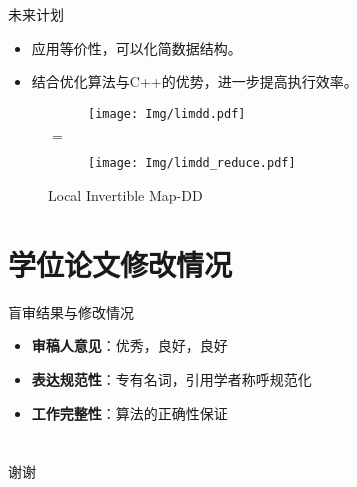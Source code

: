 \documentclass[aspectratio=1610]{ctexbeamer}
\begin{document}
\begin{frame}{未来计划}
    \begin{itemize}
        \item 应用等价性，可以化简数据结构。
        \item 结合优化算法与C++的优势，进一步提高执行效率。
    \end{itemize}
    \begin{figure}
    \centering
    \begin{subfigure}{0.4\textwidth}
        \centering
        \texttt{[image: Img/limdd.pdf]}
    \end{subfigure}
    \hspace{1em} %
    \Large$=$
    \hspace{1em} %
    \begin{subfigure}{0.4\textwidth}
        \centering
        \texttt{[image: Img/limdd\_reduce.pdf]}
    \end{subfigure}
    \caption{Local Invertible Map-DD}
\end{figure}

\end{frame}

\section{学位论文修改情况}
\begin{frame}{盲审结果与修改情况}
    \begin{itemize}
        \item \textbf{审稿人意见}：优秀，良好，良好
        \item \textbf{表达规范性}：专有名词，引用学者称呼规范化
        \item \textbf{工作完整性}：算法的正确性保证
    \end{itemize}
\end{frame}
\section*{}
\begin{frame}
    \centering
    \Huge 谢谢
\end{frame}
\end{document}
